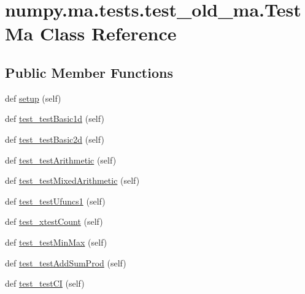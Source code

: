 \hypertarget{classnumpy_1_1ma_1_1tests_1_1test__old__ma_1_1TestMa}{}\section{numpy.\+ma.\+tests.\+test\+\_\+old\+\_\+ma.\+Test\+Ma Class Reference}
\label{classnumpy_1_1ma_1_1tests_1_1test__old__ma_1_1TestMa}
\subsection*{Public Member Functions}
\begin{DoxyCompactItemize}
\item 
def \hyperlink{classnumpy_1_1ma_1_1tests_1_1test__old__ma_1_1TestMa_aa4b69a934a0f9639b914d7183721921a}{setup} (self)
\item 
def \hyperlink{classnumpy_1_1ma_1_1tests_1_1test__old__ma_1_1TestMa_aa51e8fd48c9fe6f881c1038242f79930}{test\+\_\+test\+Basic1d} (self)
\item 
def \hyperlink{classnumpy_1_1ma_1_1tests_1_1test__old__ma_1_1TestMa_a9d28bc138bcf7eaad4b810fdc3b95cf5}{test\+\_\+test\+Basic2d} (self)
\item 
def \hyperlink{classnumpy_1_1ma_1_1tests_1_1test__old__ma_1_1TestMa_a14993a2c4a92272b5e85c8c626b7499b}{test\+\_\+test\+Arithmetic} (self)
\item 
def \hyperlink{classnumpy_1_1ma_1_1tests_1_1test__old__ma_1_1TestMa_a758d14a07d27394f2593ea4361e07a4d}{test\+\_\+test\+Mixed\+Arithmetic} (self)
\item 
def \hyperlink{classnumpy_1_1ma_1_1tests_1_1test__old__ma_1_1TestMa_a483d38197660e4177a6a01523f1e0e52}{test\+\_\+test\+Ufuncs1} (self)
\item 
def \hyperlink{classnumpy_1_1ma_1_1tests_1_1test__old__ma_1_1TestMa_af285bca6c11c4e73285e00d57620bf52}{test\+\_\+xtest\+Count} (self)
\item 
def \hyperlink{classnumpy_1_1ma_1_1tests_1_1test__old__ma_1_1TestMa_a946bf469ecae3ab91f33237e0b1590d4}{test\+\_\+test\+Min\+Max} (self)
\item 
def \hyperlink{classnumpy_1_1ma_1_1tests_1_1test__old__ma_1_1TestMa_a2c7b52064d8619002453c8faec90b304}{test\+\_\+test\+Add\+Sum\+Prod} (self)
\item 
def \hyperlink{classnumpy_1_1ma_1_1tests_1_1test__old__ma_1_1TestMa_a7954676c777799d990f0b4b6fee8615f}{test\+\_\+test\+CI} (self)
\item 

\end{DoxyCompactItemize}
